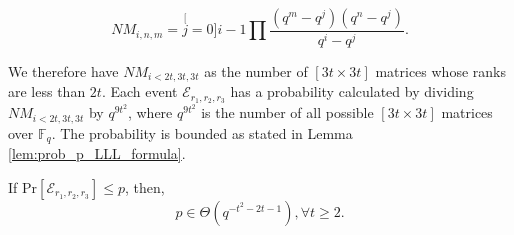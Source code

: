 \begin{equation}
NM_{i,n,m}=\stackrel[j=0]{i-1}{\mathop{\prod}}\frac{\left(q^{m}-q^{j}\right)\left(q^{n}-q^{j}\right)}{q^{i}-q^{j}}.\label{eq:num_of_rank_t_matrices}
\end{equation}

We therefore have $NM_{i<2t,3t,3t}$ as the number of $\left[3t\times3t\right]$
matrices whose ranks are less than $2t$. Each event $\mathcal{E}_{r_{1},r_{2},r_{3}}$
has a probability calculated by dividing $NM_{i<2t,3t,3t}$ by $q^{9t^{2}}$,
where $q^{9t^{2}}$ is the number of all possible $\left[3t\times3t\right]$
matrices over $\ensuremath{\mathbb{F}}_{q}$. The probability is bounded
as stated in Lemma \ref{lem:prob_p_LLL_formula}.
\begin{lem}
\label{lem:prob_p_LLL_formula} If $\mathrm{Pr}\left[\mathcal{E}_{r_{1},r_{2},r_{3}}\right]\leq p$,
then,
\[
p\in\Theta\left(q^{-t^{2}-2t-1}\right),\forall t\geq2.
\]
\end{lem}
